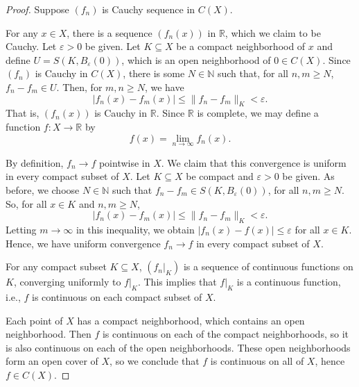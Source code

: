 \documentclass[12pt]{article}
\newcommand{\N}{\mathbb{N}}
\newcommand{\R}{\mathbb{R}}
\newcommand{\eps}{\varepsilon}
\newcommand{\<}{\langle}
\renewcommand{\>}{\rangle}
\begin{document}
\begin{proof}
    Suppose $(f_n)$ is Cauchy sequence in $C(X)$.

    For any $x \in X$, there is a sequence $(f_n(x))$ in $\R$, which we claim to be Cauchy. Let $\eps > 0$ be given. Let $K \subseteq X$ be a compact neighborhood of $x$ and define $U = S(K, B_\eps(0))$, which is an open neighborhood of $0 \in C(X)$. Since $(f_n)$ is Cauchy in $C(X)$, there is some $N \in \N$ such that, for all $n, m \geq N$, $f_n - f_m \in U$. Then, for $m, n \geq N$, we have
    \[
        |f_n(x) - f_m(x)|
            \leq \|f_n - f_m\|_K
            < \eps.
    \]
    That is, $(f_n(x))$ is Cauchy in $\R$. Since $\R$ is complete, we may define a function $f : X \to \R$ by
    \[
        f(x) = \lim_{n\to\infty} f_n(x).
    \]

    By definition, $f_n \to f$ pointwise in $X$. We claim that this convergence is uniform in every compact subset of $X$. Let $K \subseteq X$ be compact and $\eps > 0$ be given. As before, we choose $N \in \N$ such that $f_n - f_m \in S(K, B_\eps(0))$, for all $n, m \geq N$. So, for all $x \in K$ and $n, m \geq N$,
    \[
        |f_n(x) - f_m(x)| \leq \|f_n - f_m\|_K < \eps.
    \]
    Letting $m \to \infty$ in this inequality, we obtain $|f_n(x) - f(x)| \leq \eps$ for all $x \in K$. Hence, we have uniform convergence $f_n \to f$ in every compact subset of $X$.

    For any compact subset $K \subseteq X$, $(f_n|_K)$ is a sequence of continuous functions on $K$, converging uniformly to $f|_K$. This implies that $f|_K$ is a continuous function, i.e., $f$ is continuous on each compact subset of $X$.
    
    Each point of $X$ has a compact neighborhood, which contains an open neighborhood. Then $f$ is continuous on each of the compact neighborhoods, so it is also continuous on each of the open neighborhoods. These open neighborhoods form an open cover of $X$, so we conclude that $f$ is continuous on all of $X$, hence $f \in C(X)$.


\end{proof}
\end{document}
